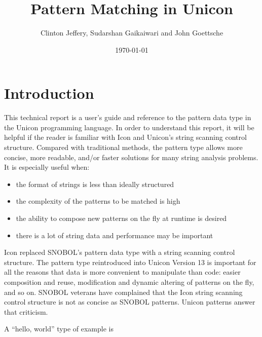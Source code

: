 \documentclass[letterpaper,12pt]{article}
\title{Pattern Matching in Unicon}
\author{Clinton Jeffery, Sudarshan Gaikaiwari and John Goettsche}
\date{\today}
\begin{document}


\maketitle


\section{Introduction}

This technical report is a user's guide and reference to the pattern
data type in the Unicon programming language. In order to understand
this report, it will be helpful if the reader is familiar with Icon
and Unicon's string scanning control structure. Compared with
traditional methods, the pattern type allows more concise, more
readable, and/or faster solutions for many string analysis problems.
It is especially useful when:

\begin{itemize}
\item the format of strings is less than ideally structured
\item the complexity of the patterns to be matched is high
\item the ability to compose new patterns on the fly at runtime is
desired
\item there is a lot of string data and performance may be important
\end{itemize}

Icon replaced SNOBOL's pattern data type with a
string scanning control structure.  The pattern type reintroduced
into Unicon Version 13 is important for all the reasons that data
is more convenient to manipulate than code: easier composition and
reuse, modification and dynamic altering of patterns on the fly, and
so on. SNOBOL veterans have complained that the Icon string
scanning control structure is not as concise as SNOBOL patterns.
Unicon patterns answer that criticism.

A ``hello, world'' type of example is
\end{document}
